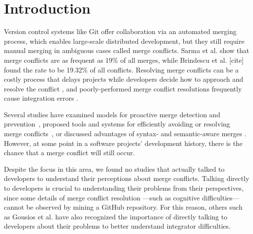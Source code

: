 \section{Introduction}\label{introduction}


Version control systems like Git offer collaboration via an automated merging process, which enables large-scale distributed development, but they still require manual merging in ambiguous cases called merge conflicts. Sarma et al. \cite{cassandra} show that merge conflicts are as frequent as 19\% of all merges, while Brindescu et al. [cite] found the rate to be 19.32\% of all conflicts. Resolving merge conflicts can be a costly process that delays projects while developers decide how to approach and resolve the conflict \cite{cassandra}, and poorly-performed merge conflict resolutions frequently cause integration errors \cite{bird-branches-conflict}.


Several studies have examined models for proactive merge detection and prevention~\cite{Brun2011}\cite{palantir}\cite{Guimaraes}, proposed tools and systems for efficiently avoiding or resolving merge conflicts~\cite{nishimura}\cite{mens2002state}, or discussed advantages of syntax- and semantic-aware merges \cite{danny_refactorings}\cite{hunt2002extensible}. However, at some point in a software projects' development history, there is the chance that a merge conflict will still occur. 


Despite the focus in this area, we found no studies that actually talked to developers to understand their perceptions about merge conflicts. Talking directly to developers is crucial to understanding their problems from their perspectives, since some details of merge conflict resolution ---such as cognitive difficulties--- cannot be observed by mining a GitHub repository. For this reason, others such as Gousios et al. \cite{integrator_perspective} have also recognized the importance of directly talking to developers about their problems to better understand integrator difficulties.\\

